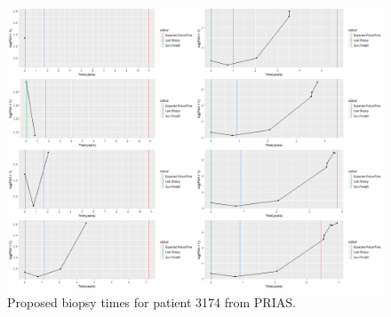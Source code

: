 

\begin{figure}[!htb]
\centering
\captionsetup{justification=centering}
\includegraphics[width=\textwidth]{prias_demo_pid_3174.png}
\caption{\label{fig : prias_demo_pid_3174} Proposed biopsy times for patient 3174 from PRIAS.}
\end{figure}

